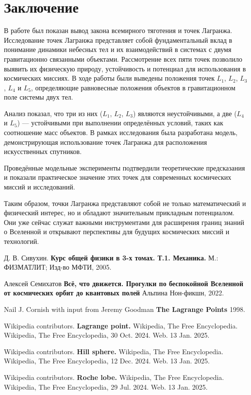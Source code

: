 \documentclass[a4paper,12pt]{article}
\begin{document}
\section{Заключение}
В работе был показан вывод закона всемирного тяготения и точек Лагранжа.
Исследование точек Лагранжа представляет собой фундаментальный вклад в понимание динамики небесных тел и их взаимодействий в системах с двумя гравитационно связанными объектами.
Рассмотрение всех пяти точек позволило выявить их физическую природу, устойчивость и потенциал для использования в космических миссиях.
В ходе работы были выведены положения точек $L_1$, $L_2$, $L_3$, $L_4$ и $L_5$, определяющие равновесные положения объектов в гравитационном поле системы двух тел.

Анализ показал, что три из них ($L_1$, $L_2$, $L_3$) являются неустойчивыми, а две ($L_4$ и $L_5$) — устойчивыми при выполнении определённых условий, таких как соотношение масс объектов.
В рамках исследования была разработана модель, демонстрирующая использование точек Лагранжа для расположения искусственных спутников.

Проведённые модельные эксперименты подтвердили теоретические предсказания и показали практическое значение этих точек для современных космических миссий и исследований.

Таким образом, точки Лагранжа представляют собой не только математический и физический интерес, но и обладают значительным прикладным потенциалом.
Они уже сейчас служат важными инструментами для расширения границ знаний о Вселенной и открывают перспективы для будущих космических миссий и технологий.
                     
\begin{thebibliography}{6}
 Д. В. Сивухин. {\bf  Курс общей физики в 3-х томах. Т.1. Механика. } М.: ФИЗМАТЛИТ; Изд-во МФТИ, 2005.

 Алексей Семихатов {\bf Всё, что движется. Прогулки по беспокойной Вселенной от космических орбит до квантовых полей} Альпина Нон-фикшн, 2022.

 Nail J. Cornish with input from Jeremy Goodman {\bf The Lagrange Points} 1998.

 Wikipedia contributors. {\bf Lagrange point.} Wikipedia, The Free Encyclopedia. Wikipedia, The Free Encyclopedia, 30 Oct. 2024. Web. 13 Jan. 2025.

 Wikipedia contributors. {\bf Hill sphere.} Wikipedia, The Free Encyclopedia. Wikipedia, The Free Encyclopedia, 12 Dec. 2024. Web. 13 Jan. 2025.

 Wikipedia contributors. {\bf Roche lobe.} Wikipedia, The Free Encyclopedia. Wikipedia, The Free Encyclopedia, 29 Jul. 2024. Web. 13 Jan. 2025.


\end{thebibliography}
\end{document}
